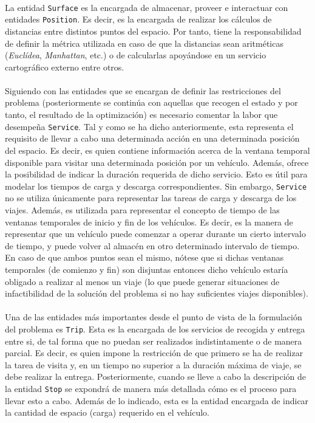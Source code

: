 \documentclass{subfiles}
\begin{document}
          \paragraph{}
          La entidad \texttt{Surface} es la encargada de almacenar, proveer e interactuar con entidades \texttt{Position}. Es decir, es la encargada de realizar los cálculos de distancias entre distintos puntos del espacio. Por tanto, tiene la responsabilidad de definir la métrica utilizada en caso de que la distancias sean aritméticas (\emph{Euclídea}, \emph{Manhattan}, etc.) o de calcularlas apoyándose en un servicio cartográfico externo entre otros.

          \paragraph{}
          Siguiendo con las entidades que se encargan de definir las restricciones del problema (posteriormente se continúa con aquellas que recogen el estado y por tanto, el resultado de la optimización) es necesario comentar la labor que desempeña \texttt{Service}. Tal y como se ha dicho anteriormente, esta representa el requisito de llevar a cabo una determinada acción en una determinada posición del espacio. Es decir, es quien contiene información acerca de la ventana temporal disponible para visitar una determinada posición por un vehículo. Además, ofrece la posibilidad de indicar la duración requerida de dicho servicio. Esto es útil para modelar los tiempos de carga y descarga correspondientes. Sin embargo, \texttt{Service} no se utiliza únicamente para representar las tareas de carga y descarga de los viajes. Además, es utilizada para representar el concepto de tiempo de las ventanas temporales de inicio y fin de los vehículos. Es decir, es la manera de representar que un vehículo puede comenzar a operar durante un cierto intervalo de tiempo, y puede volver al almacén en otro determinado intervalo de tiempo. En caso de que ambos puntos sean el mismo, nótese que si dichas ventanas temporales (de comienzo y fin) son disjuntas entonces dicho vehículo estaría obligado a realizar al menos un viaje (lo que puede generar situaciones de infactibilidad de la solución del problema si no hay suficientes viajes disponibles). 

          \paragraph{}
          Una de las entidades más importantes desde el punto de vista de la formulación del problema es \texttt{Trip}. Esta es la encargada de  los servicios de recogida y entrega entre si, de tal forma que no puedan ser realizados indistintamente o de manera parcial. Es decir, es quien impone la restricción de que primero se ha de realizar la tarea de visita y, en un tiempo no superior a la duración máxima de viaje, se debe realizar la entrega. Posteriormente, cuando se lleve a cabo la descripción de la entidad \texttt{Stop} se expondrá de manera más detallada cómo es el proceso para llevar esto a cabo. Además de lo indicado, esta es la entidad encargada de indicar la cantidad de espacio (carga) requerido en el vehículo. 
\end{document}
